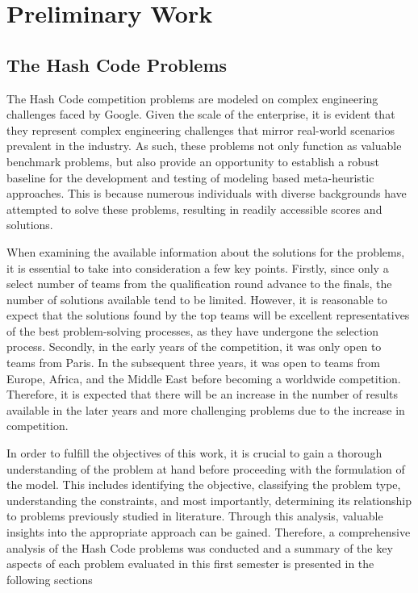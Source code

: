 \chapter{Preliminary Work}
\label{chapter:preliminary-work}

\section{The Hash Code Problems}
\label{section:hashcode}

The Hash Code competition problems are modeled on complex engineering challenges
faced by Google. Given the scale of the enterprise, it is evident that they
represent complex engineering challenges that mirror real-world scenarios
prevalent in the industry. As such, these problems not only function as valuable
benchmark problems, but also provide an opportunity to establish a robust
baseline for the development and testing of modeling based meta-heuristic
approaches. This is because numerous individuals with diverse backgrounds have
attempted to solve these problems, resulting in readily accessible scores and
solutions.

When examining the available information about the solutions for the problems,
it is essential to take into consideration a few key points. Firstly, since only
a select number of teams from the qualification round advance to the finals, the
number of solutions available tend to be limited. However, it is reasonable to
expect that the solutions found by the top teams will be excellent
representatives of the best problem-solving processes, as they have undergone
the selection process. Secondly, in the early years of the competition, it was
only open to teams from Paris. In the subsequent three years, it was open to
teams from Europe, Africa, and the Middle East before becoming a worldwide
competition. Therefore, it is expected that there will be an increase in the
number of results available in the later years and more challenging problems due
to the increase in competition.

In order to fulfill the objectives of this work, it is crucial to gain a
thorough understanding of the problem at hand before proceeding with the
formulation of the model. This includes identifying the objective, classifying
the problem type, understanding the constraints, and most importantly,
determining its relationship to problems previously studied in literature.
Through this analysis, valuable insights into the appropriate approach can be
gained. Therefore, a comprehensive analysis of the Hash Code problems was
conducted and a summary of the key aspects of each problem evaluated in this
first semester is presented in the following sections

